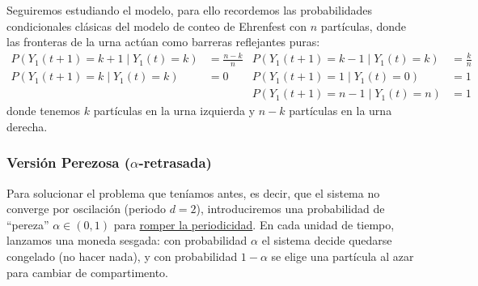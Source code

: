 \begin{center}
\end{center}
Seguiremos estudiando el modelo, para ello recordemos las probabilidades condicionales clásicas del modelo de conteo de Ehrenfest con $n$ partículas, donde las fronteras de la urna actúan como barreras reflejantes puras:
\begin{align*}
    P(Y_1(t+1) = k+1 \mid Y_1(t) = k) &= \frac{n-k}{n} & P(Y_1(t+1) = k-1 \mid Y_1(t) = k) &= \frac{k}{n} \\[0.2cm]
    P(Y_1(t+1) = k \mid Y_1(t) = k) &= 0 & P(Y_1(t+1) = 1 \mid Y_1(t) = 0) &= 1 \\[0.2cm]
    & & P(Y_1(t+1) = n-1 \mid Y_1(t) = n) &= 1
\end{align*}
donde tenemos $k$ partículas en la urna izquierda y $n-k$ partículas en la urna derecha.

\subsubsection{Versión Perezosa ($\alpha$-retrasada)}
\noindent
Para solucionar el problema que teníamos antes, es decir, que el sistema no converge por oscilación (periodo $d=2$), introduciremos una probabilidad de ``pereza'' $\alpha \in (0,1)$ para \underline{romper la periodicidad}. En cada unidad de tiempo, lanzamos una moneda sesgada: con probabilidad $\alpha$ el sistema decide quedarse congelado (no hacer nada), y con probabilidad $1-\alpha$ se elige una partícula al azar para cambiar de compartimento.

